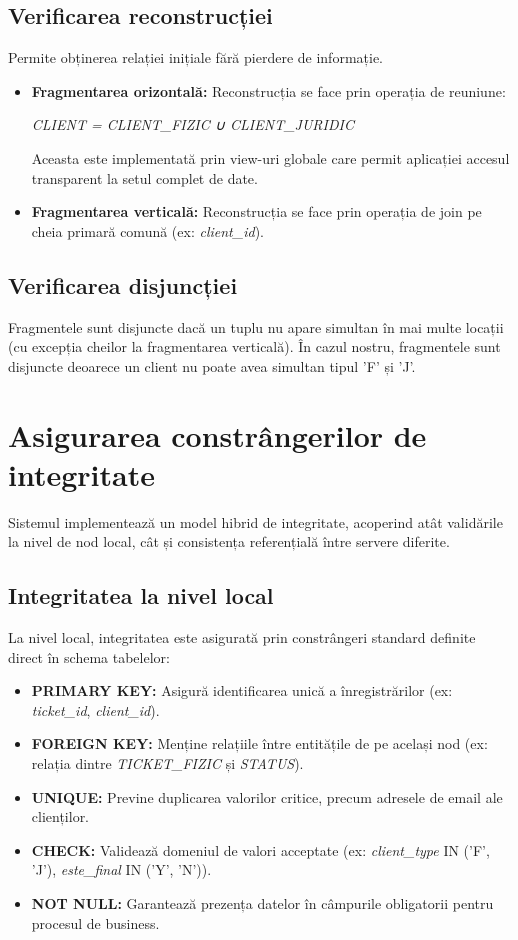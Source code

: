 \subsection{Verificarea reconstrucției}
Permite obținerea relației inițiale fără pierdere de informație.
\begin{itemize}
\item \textbf{Fragmentarea orizontală:} Reconstrucția se face prin operația de reuniune:
\begin{center} \textit{CLIENT = CLIENT\_FIZIC ∪ CLIENT\_JURIDIC} \end{center}
Aceasta este implementată prin view-uri globale care permit aplicației accesul transparent la setul complet de date.
\item \textbf{Fragmentarea verticală:} Reconstrucția se face prin operația de join pe cheia primară comună (ex: \textit{client\_id}).
\end{itemize}
\subsection{Verificarea disjuncției}
Fragmentele sunt disjuncte dacă un tuplu nu apare simultan în mai multe locații (cu excepția cheilor la fragmentarea verticală). În cazul nostru, fragmentele sunt disjuncte deoarece un client nu poate avea simultan tipul 'F' și 'J'.
\section{Asigurarea constrângerilor de integritate}
Sistemul implementează un model hibrid de integritate, acoperind atât validările la nivel de nod local, cât și consistența referențială între servere diferite.
\subsection{Integritatea la nivel local}
La nivel local, integritatea este asigurată prin constrângeri standard definite direct în schema tabelelor:
\begin{itemize}
\item \textbf{PRIMARY KEY:} Asigură identificarea unică a înregistrărilor (ex: \textit{ticket\_id}, \textit{client\_id}).
\item \textbf{FOREIGN KEY:} Menține relațiile între entitățile de pe același nod (ex: relația dintre \textit{TICKET\_FIZIC} și \textit{STATUS}).
\item \textbf{UNIQUE:} Previne duplicarea valorilor critice, precum adresele de email ale clienților.
\item \textbf{CHECK:} Validează domeniul de valori acceptate (ex: \textit{client\_type} IN ('F', 'J'), \textit{este\_final} IN ('Y', 'N')).
\item \textbf{NOT NULL:} Garantează prezența datelor în câmpurile obligatorii pentru procesul de business.
\end{itemize}
